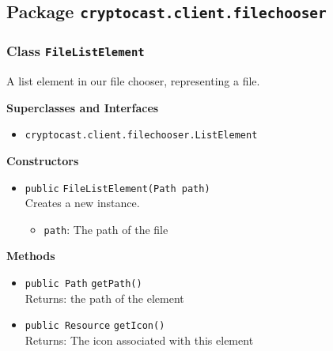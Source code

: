 \subsection{Package \lstinline!cryptocast.client.filechooser!}

\subsubsection{Class \lstinline|FileListElement|}
A list element in our file chooser, representing a file. \\



\textbf{Superclasses and Interfaces}
\begin{itemize}
\item \lstinline|cryptocast.client.filechooser.ListElement|
\end{itemize}



\textbf{Constructors}
\begin{itemize}
\item \lstinline|public| \lstinline|FileListElement|\lstinline|(Path path)|\\
Creates a new instance.
\begin{itemize}
\item \lstinline|path|: The path of the file
\end{itemize}



\end{itemize}


\textbf{Methods}
\begin{itemize}
\item \lstinline|public Path| \lstinline|getPath|\lstinline|()|\\
Returns: the path of the element



\item \lstinline|public Resource| \lstinline|getIcon|\lstinline|()|\\
Returns: The icon associated with this element



\end{itemize}


